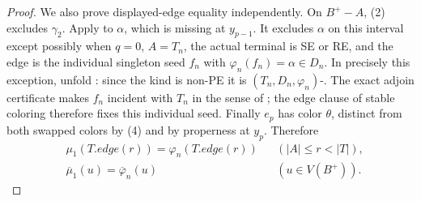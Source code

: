\begin{proof}
We also prove displayed-edge equality independently.  On \(B^+-A\),
(2) excludes \(\gamma_2\).  Apply
 to \(\alpha\), which is
missing at \(y_{p-1}\).  It excludes \(\alpha\) on this interval except
possibly when \(q=0\), \(A=T_n\), the actual terminal
 is SE or RE, and the edge is the individual
singleton seed \(f_n\) with \(\varphi_n(f_n)=\alpha\in D_n\).
In precisely this exception, unfold
: since the kind is non-PE it is
\((T_n,D_n,\varphi_n)\)-.  The exact adjoin
certificate makes \(f_n\) incident with \(T_n\) in the sense of
; the edge clause of stable coloring therefore
fixes this individual seed.  Finally \(e_p\) has color \(\theta\),
distinct from both swapped colors by (4) and by properness at \(y_p\).
Therefore
\[
 \begin{aligned}
 &\mu_1(T.\mathit{edge}(r))=\varphi_n(T.\mathit{edge}(r))
       &&(|A|\leq r<|T|),\\
 &\overline\mu_1(u)=\overline\varphi_n(u)
       &&(u\in V(B^+)).
 \end{aligned}                                                \tag{6}
\]


\end{proof}
